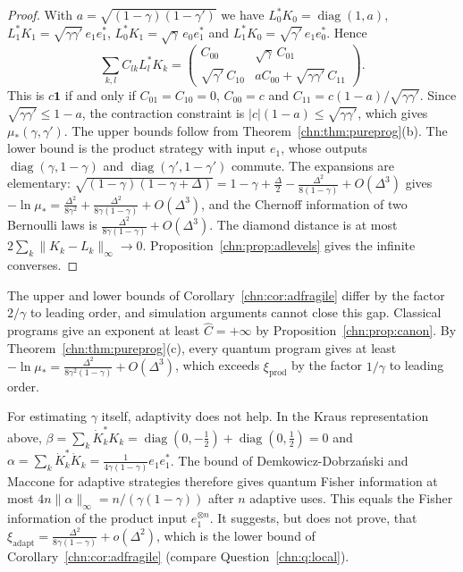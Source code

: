 \begin{proof}
With $a=\sqrt{(1-\gamma)(1-\gamma')}$ we have $L_0^*K_0=\operatorname{diag}(1,a)$, $L_1^*K_1=\sqrt{\gamma\gamma'}\,e_1e_1^*$, $L_0^*K_1=\sqrt\gamma\,e_0e_1^*$ and $L_1^*K_0=\sqrt{\gamma'}\,e_1e_0^*$. Hence
\[
\sum_{k,l}C_{lk}L_l^*K_k=\begin{pmatrix}C_{00}&\sqrt\gamma\,C_{01}\\\sqrt{\gamma'}\,C_{10}&aC_{00}+\sqrt{\gamma\gamma'}\,C_{11}\end{pmatrix}.
\]
This is $c\mathbf 1$ if and only if $C_{01}=C_{10}=0$, $C_{00}=c$ and $C_{11}=c(1-a)/\sqrt{\gamma\gamma'}$. Since $\sqrt{\gamma\gamma'}\le1-a$, the contraction constraint is $|c|(1-a)\le\sqrt{\gamma\gamma'}$, which gives $\mu_*(\gamma,\gamma')$. The upper bounds follow from Theorem~\ref{chn:thm:pureprog}(b). The lower bound is the product strategy with input $e_1$, whose outputs $\operatorname{diag}(\gamma,1-\gamma)$ and $\operatorname{diag}(\gamma',1-\gamma')$ commute. The expansions are elementary: $\sqrt{(1-\gamma)(1-\gamma+\Delta)}=1-\gamma+\frac\Delta2-\frac{\Delta^2}{8(1-\gamma)}+O(\Delta^3)$ gives $-\ln\mu_*=\frac{\Delta^2}{8\gamma^2}+\frac{\Delta^2}{8\gamma(1-\gamma)}+O(\Delta^3)$, and the Chernoff information of two Bernoulli laws is $\frac{\Delta^2}{8\gamma(1-\gamma)}+O(\Delta^3)$. The diamond distance is at most $2\sum_k\|K_k-L_k\|_\infty\to0$. Proposition~\ref{chn:prop:adlevels} gives the infinite converses.
\end{proof}

\begin{remark}\label{chn:rem:adnosim}
The upper and lower bounds of Corollary~\ref{chn:cor:adfragile} differ by the factor $2/\gamma$ to leading order, and simulation arguments cannot close this gap. Classical programs give an exponent at least $\widehat C=+\infty$ by Proposition~\ref{chn:prop:canon}. By Theorem~\ref{chn:thm:pureprog}(c), every quantum program gives at least $-\ln\mu_*=\frac{\Delta^2}{8\gamma^2(1-\gamma)}+O(\Delta^3)$, which exceeds $\xi_{\mathrm{prod}}$ by the factor $1/\gamma$ to leading order.
\end{remark}

\begin{remark}\label{chn:rem:adfisher}
For estimating $\gamma$ itself, adaptivity does not help. In the Kraus representation above, $\beta=\sum_k\dot K_k^*K_k=\operatorname{diag}(0,-\tfrac12)+\operatorname{diag}(0,\tfrac12)=0$ and $\alpha=\sum_k\dot K_k^*\dot K_k=\frac1{4\gamma(1-\gamma)}e_1e_1^*$. The bound of Demkowicz-Dobrza\'nski and Maccone for adaptive strategies \cite{DemkowiczDobrzanskiMaccone2014} therefore gives quantum Fisher information at most $4n\|\alpha\|_\infty=n/(\gamma(1-\gamma))$ after $n$ adaptive uses. This equals the Fisher information of the product input $e_1^{\otimes n}$. It suggests, but does not prove, that $\xi_{\mathrm{adapt}}=\frac{\Delta^2}{8\gamma(1-\gamma)}+o(\Delta^2)$, which is the lower bound of Corollary~\ref{chn:cor:adfragile} (compare Question~\ref{chn:q:local}).
\end{remark}

